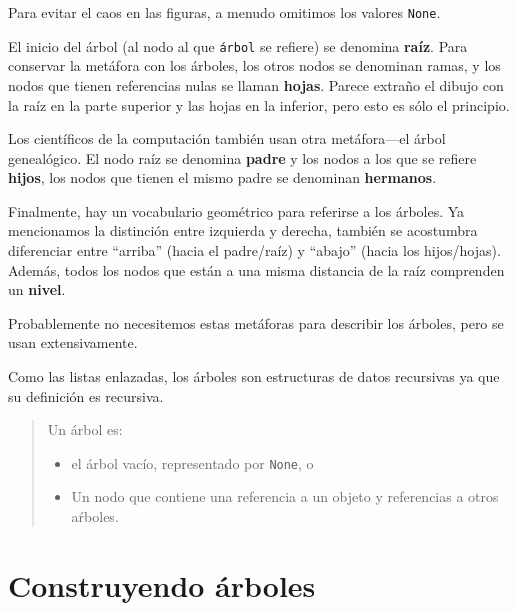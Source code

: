 Para evitar el caos en las figuras, a menudo omitimos los valores \texttt{None}.

El inicio del árbol (al nodo al que  \texttt{árbol} se refiere) se denomina 
{\bf  raíz}.  Para conservar la metáfora con los árboles, los otros nodos
se denominan ramas, y los nodos que tienen referencias nulas se 
llaman {\bf hojas}. Parece extraño el dibujo con la raíz en la parte
superior y las hojas en la inferior, pero esto es sólo el principio.


Los científicos de la computación también usan otra metáfora---el árbol 
genealógico. El nodo raíz se denomina {\bf padre} y los nodos a los que se
refiere {\bf hijos}, los nodos que tienen el mismo padre se denominan 
{\bf hermanos}.

Finalmente, hay un vocabulario geométrico para referirse a los árboles.
Ya mencionamos la distinción entre izquierda y derecha, también se
acostumbra diferenciar entre  ``arriba'' (hacia el padre/raíz) y 
``abajo'' (hacia los hijos/hojas). Además, todos los nodos que están
a una misma distancia de la raíz comprenden un {\bf nivel}.

Probablemente no necesitemos estas metáforas para describir los 
árboles, pero se usan extensivamente. 

Como las listas enlazadas, los árboles son estructuras de datos recursivas
ya que su definición es recursiva.


\begin{quote}
Un árbol es:

\begin{itemize}

\item el árbol vacío, representado por \texttt{None}, o

\item Un nodo que contiene una referencia a un  objeto y 
referencias a otros aŕboles.

\end{itemize}

\end{quote}



\section {Construyendo árboles}

